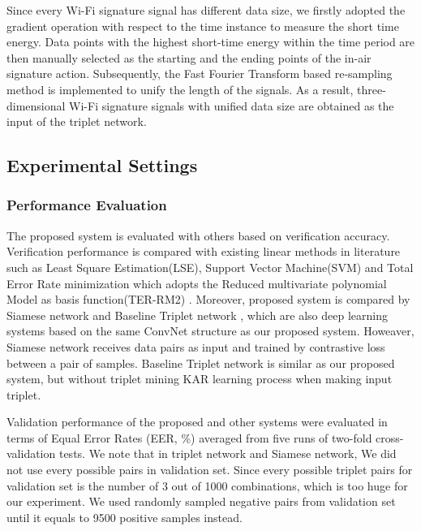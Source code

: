 \documentclass[runningheads]{llncs}
\begin{document}
 Since every Wi-Fi signature signal has different data size, we firstly adopted the gradient operation with respect to the time instance to measure the short time energy. Data points with the highest short-time energy within the time period are then manually selected as the starting and the ending points of the in-air signature action. Subsequently, the Fast Fourier Transform based re-sampling method \cite{moon2017air} is implemented to unify the length of the signals. As a result, three-dimensional Wi-Fi signature signals with unified data size are obtained as the input of the triplet network.

\subsection{Experimental Settings}

\subsubsection{Performance Evaluation}
The proposed system is evaluated with others based on verification accuracy. Verification performance is compared with existing linear methods in literature such as Least Square Estimation(LSE), Support Vector Machine(SVM) and Total Error Rate minimization which adopts the Reduced multivariate polynomial Model as basis function(TER-RM2) \cite{toh2003fingerprint,toh2008between}. Moreover, proposed system is compared by  Siamese network \cite{koch2015siamese} and Baseline Triplet network \cite{hoffer2015deep}, which are also deep learning systems based on the same ConvNet structure as our proposed system. Howeaver, Siamese network receives data pairs as input and trained by contrastive loss between a pair of samples. Baseline Triplet network is similar as our proposed system, but without triplet mining KAR learning process when making input triplet.

Validation performance of the proposed and other systems were evaluated in terms of Equal Error Rates (EER, \%) averaged from five runs of two-fold cross-validation tests. 
We note that in triplet network and Siamese network, We did not use every possible pairs in validation set.
Since every possible triplet pairs for validation set is the number of 3 out of 1000 combinations, which is too huge for our experiment. We used randomly sampled negative pairs from validation set until it equals to 9500 positive samples instead.
\end{document}
